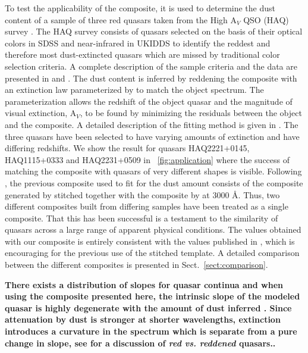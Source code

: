\documentclass{aa}    %
\newcommand{\figref}[1]{\ref{fig:#1}}
\newcommand{\Fig}[1]{\figurename~\figref{#1}}
\newcommand{\fig}[1]{\Fig{#1}}
\newcommand{\sectionname}{Sect.}
\newcommand{\Sect}[1]{\sectionname~\ref{sect:#1}}
\newcommand{\sect}[1]{\Sect{#1}}
\begin{document}
To test the applicability of the composite, it is used to determine the dust
content of a sample of three red quasars taken from the High A$_V$ QSO (HAQ)
survey \citep{Krogager2015}. The HAQ survey consists of quasars selected on the
basis of their optical colors in SDSS and near-infrared in UKIDDS to identify
the reddest and therefore most dust-extincted quasars which are missed by
traditional color selection criteria. A complete description of the sample
criteria and the data are presented in \citet{Fynbo2013} and
\citet{Krogager2015}. The dust content is inferred by reddening the composite
with an extinction law parameterized by \citet{Gordon2003} to match the object
spectrum. The parameterization allows the redshift of the object quasar and the
magnitude of visual extinction, A$_V$, to be found by minimizing the residuals
between the object and the composite. A detailed description of the fitting
method is given in \cite{Krogager2015}.
The three quasars have been selected to have varying amounts of extinction and
have differing redshifts. We show the result for quasars HAQ2221+0145,
HAQ1115+0333 and HAQ2231+0509 in \fig{application} where the success of matching
the composite with quasars of very different shapes is visible. 
Following \cite{Wang2012}, the previous composite used to fit for the dust
amount consists of the composite generated by \cite{VandenBerk2001} stitched
together with the composite by \cite{Glikman2006} at 3000 \AA. Thus, two
different composites built from differing samples have been treated as a single
composite. That this has been successful is a testament to the similarity of
quasars across a large range of apparent physical conditions. 
The values obtained with our composite is entirely consistent with the values
published in \cite{Krogager2015}, which is encouraging for the previous use of
the stitched template. A detailed comparison between the different composites is
presented in \sect{comparison}. 

\textbf{There exists a distribution of slopes for quasar continua and when using the composite presented here, the intrinsic slope of the modeled quasar is highly degenerate with the amount of dust inferred \citep{Reichard2003a}. Since attenuation by dust is stronger at shorter wavelengths, extinction introduces a curvature in the spectrum which is separate from a pure change in slope, see
\citet{Krawczyk2015} for a discussion of \textit{red vs. reddened} quasars.. }
\end{document}
